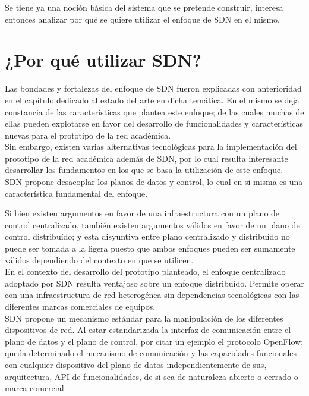 Se tiene ya una noción básica del sistema que se pretende construir, interesa entonces analizar por qu\'e se quiere utilizar el enfoque de SDN en el mismo.
  
\section[¿Por qu\'e utilizar SDN?]{¿Por qu\'e utilizar SDN?}

Las bondades y fortalezas del enfoque de SDN fueron explicadas con anterioridad en el cap\'itulo dedicado al estado del arte en dicha tem\'atica. En el mismo se deja constancia de las caracter\'isticas que plantea este enfoque; de las cuales muchas de ellas pueden explotarse en favor del desarrollo de funcionalidades y caracter\'isticas nuevas para el prototipo de la red acad\'emica.\\

Sin embargo, existen varias alternativas tecnol\'ogicas para la implementaci\'on del prototipo de la red acad\'emica adem\'as de SDN, por lo cual resulta interesante desarrollar los fundamentos en los que se basa la utilizaci\'on de este enfoque.\\  

SDN propone desacoplar los planos de datos y control, lo cual en si misma es una caracter\'istica fundamental del enfoque.

Si bien existen argumentos en favor de una infraestructura con un plano de control centralizado, tambi\'en existen argumentos v\'alidos en favor de un plano de control distribu\'ido; y esta disyuntiva entre plano centralizado y distribu\'ido no puede ser tomada a la ligera puesto que ambos enfoques pueden ser sumamente v\'alidos dependiendo del contexto en que se utilicen.\\

En el contexto del desarrollo del prototipo planteado, el enfoque centralizado adoptado por SDN resulta ventajoso sobre un enfoque distribu\'ido. Permite operar con una infraestructura de red heterog\'enea sin dependencias tecnol\'ogicas con las diferentes marcas comerciales de equipos.\\

SDN propone un mecanismo estándar para la manipulaci\'on de los diferentes dispositivos de red. Al estar estandarizada la interfaz de comunicaci\'on entre el plano de datos y el plano de control, por citar un ejemplo el protocolo OpenFlow; queda determinado el mecanismo de comunicaci\'on y las capacidades funcionales con cualquier dispositivo del plano de datos independientemente de sus, arquitectura, API de funcionalidades, de si sea de naturaleza abierto o cerrado o marca comercial.\\ 

